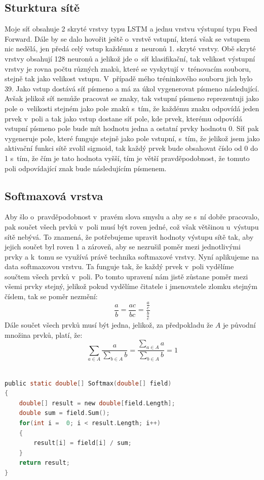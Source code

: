 \documentclass[a4paper]{article}
\begin{document}
\subsection{Sturktura sítě}
Moje síť obsahuje 2 skryté vrstvy typu LSTM a jednu vrstvu výstupní typu Feed Forward. Dále by se dalo hovořit ještě o~vrstvě vstupní, která však se vstupem nic nedělá, jen předá celý vstup každému z~neuronů 1. skryté vrstvy. Obě skryté vrstvy obsahují 128 neuronů a jelikož jde o~síť klasifikační, tak velikost výstupní vrstvy je rovna počtu různých znaků, které se vyskytují v~trénovacím souboru, stejně tak jako velikost vstupu. V~případě mého tréninkového souboru jich bylo 39. Jako vstup dostává síť písmeno a má za úkol vygenerovat písmeno následující. Avšak jelikož síť nemůže pracovat se znaky, tak vstupní písmeno reprezentuji jako pole o~velikosti stejném jako pole znaků s~tím, že každému znaku odpovídá jeden prvek v~poli a tak jako vstup dostane síť pole, kde prvek, kterému odpovídá vstupní písmeno pole bude mít hodnotu jedna a ostatní prvky hodnotu 0. Síť pak vygeneruje pole, které funguje stejně jako pole vstupní, s~tím, že jelikož jsem jako aktivační funkci sítě zvolil sigmoid, tak každý prvek bude obsahovat číslo od 0 do 1 s~tím, že čím je tato hodnota vyšší, tím je větší pravděpodobnost, že tomuto poli odpovídající znak bude následujícím písmenem.
\subsection{Softmaxová vrstva}
Aby šlo o~pravděpodobnost v~pravém slova smyslu a aby se s~ní dobře pracovalo, pak součet všech prvků v~poli musí být roven jedné, což však většinou u~výstupu sítě nebývá. To znamená, že potřebujeme upravit hodnoty výstupu sítě tak, aby jejich součet byl roven 1 a zároveň, aby se nezrušil poměr mezi jednotlivými prvky a k~tomu se využívá právě technika softmaxové vrstvy. Nyní aplikujeme na data softmaxovou vrstvu. Ta funguje tak, že každý prvek v~poli vydělíme součtem všech prvků v~poli. Po tomto upravení nám jistě zůstane poměr mezi všemi prvky stejný, jelikož pokud vydělíme čitatele i jmenovatele zlomku stejným číslem, tak se poměr nezmění:
$$
	\frac{a}{b} = \frac{ac}{bc} = \frac{\frac{a}{c}}{\frac{b}{c}}
$$
Dále součet všech prvků musí být jedna, jelikož, za předpokladu že $A$ je původní množina prvků, platí, že:
$$
	\sum\limits_{a \in A}^{}\frac{a}{\sum\limits_{b \in A}^{}b} = \frac{\sum\limits_{a \in A}^{}a}{\sum\limits_{b \in A}^{}b} = 1
$$
\begin{lstlisting}[language=C, title={Ukázka kódu softmaxové vrstvy (i s~převodem na nezáporná čísla)}]

public static double[] Softmax(double[] field)
{
	double[] result = new double[field.Length];
	double sum = field.Sum();
	for(int i =  0; i < result.Length; i++)
	{
		result[i] = field[i] / sum;
	}
	return result;
}
\end{lstlisting}
\end{document}
